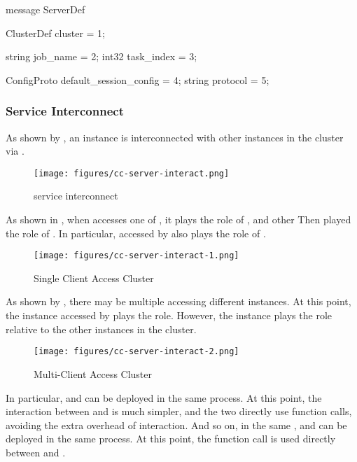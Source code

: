 \begin{content}
\begin{leftbar}
\begin{python}
message ServerDef {
  ClusterDef cluster = 1;
  
  string job_name = 2;
  int32 task_index = 3;

  ConfigProto default_session_config = 4;
  string protocol = 5;
}
\end{python}
\end{leftbar}


\subsubsection{Service Interconnect}
As shown by , an  instance is interconnected with other  instances in the cluster via .

\begin{figure}[H]
  \centering
  \texttt{[image: figures/cc-server-interact.png]}
  \caption{service interconnect}
  \label{fig:cc-server-interact}
\end{figure}

As shown in , when  accesses one of , it plays the role of , and other  Then played the role of . In particular,  accessed by  also plays the role of .

\begin{figure}[H]
  \centering
  \texttt{[image: figures/cc-server-interact-1.png]}
  \caption{Single Client Access Cluster}
  \label{fig:cc-server-interact-1}
\end{figure}

As shown by , there may be multiple  accessing different  instances. At this point, the  instance accessed by  plays the  role. However, the  instance plays the  role relative to the other  instances in the cluster.

\begin{figure}[H]
  \centering
  \texttt{[image: figures/cc-server-interact-2.png]}
  \caption{Multi-Client Access Cluster}
  \label{fig:cc-server-interact-2}
\end{figure}

In particular,  and  can be deployed in the same process. At this point, the interaction between  and  is much simpler, and the two directly use function calls, avoiding the extra overhead of  interaction. And so on, in the same ,  and  can be deployed in the same process. At this point, the function call is used directly between  and .



\end{content}
